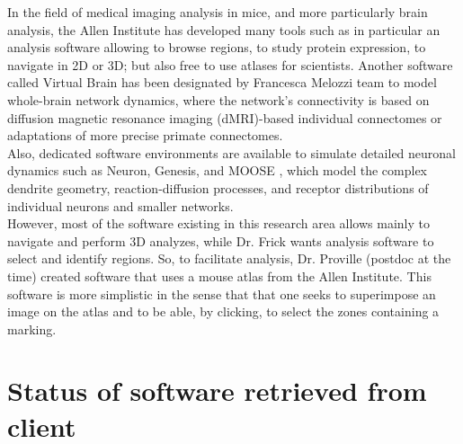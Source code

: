 \documentclass[a4paper,12pt]{report}
\begin{document}
In the field of medical imaging analysis in mice, and more particularly brain analysis, the Allen Institute has developed many tools such as in particular an analysis software allowing to browse regions, to study protein expression, to navigate in 2D or 3D; but also free to use atlases for scientists. Another software called Virtual Brain has been designated by Francesca Melozzi team \cite{vmb} to model whole-brain network dynamics, where the network’s connectivity is based on diffusion magnetic resonance imaging (dMRI)-based individual connectomes or adaptations of more precise primate connectomes.\\

Also, dedicated software environments are available to simulate detailed neuronal dynamics such as Neuron, Genesis, and MOOSE \cite{genesis}, which model the complex dendrite geometry, reaction-diffusion processes, and receptor distributions of individual neurons and smaller networks. \\

However, most of the software existing in this research area allows mainly to navigate and perform 3D analyzes, while Dr. Frick wants analysis software to select and identify regions. So, to facilitate analysis, Dr. Proville (postdoc at the time) created software that uses a mouse atlas from the Allen Institute. This software is more simplistic in the sense that that one seeks to superimpose an image on the atlas and to be able, by clicking, to select the zones containing a marking.\\


\section{Status of software retrieved from client}
\end{document}
